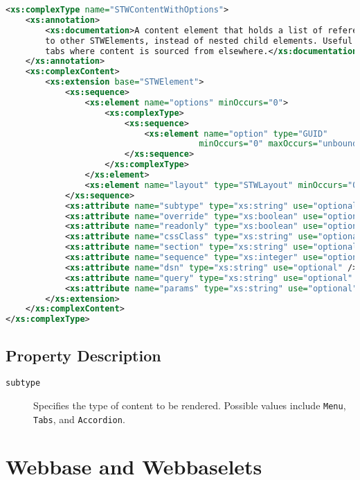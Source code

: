 \begin{lstlisting}[language=XML,caption={STWContentWithOptions XSD Definition}]
<xs:complexType name="STWContentWithOptions">
    <xs:annotation>
        <xs:documentation>A content element that holds a list of references (options) 
        to other STWElements, instead of nested child elements. Useful for menus and 
        tabs where content is sourced from elsewhere.</xs:documentation>
    </xs:annotation>
    <xs:complexContent>
        <xs:extension base="STWElement">
            <xs:sequence>
                <xs:element name="options" minOccurs="0">
                    <xs:complexType>
                        <xs:sequence>
                            <xs:element name="option" type="GUID" 
                                       minOccurs="0" maxOccurs="unbounded" />
                        </xs:sequence>
                    </xs:complexType>
                </xs:element>
                <xs:element name="layout" type="STWLayout" minOccurs="0" />
            </xs:sequence>
            <xs:attribute name="subtype" type="xs:string" use="optional" />
            <xs:attribute name="override" type="xs:boolean" use="optional" />
            <xs:attribute name="readonly" type="xs:boolean" use="optional" />
            <xs:attribute name="cssClass" type="xs:string" use="optional" />
            <xs:attribute name="section" type="xs:string" use="optional" />
            <xs:attribute name="sequence" type="xs:integer" use="optional" />
            <xs:attribute name="dsn" type="xs:string" use="optional" />
            <xs:attribute name="query" type="xs:string" use="optional" />
            <xs:attribute name="params" type="xs:string" use="optional" />
        </xs:extension>
    </xs:complexContent>
</xs:complexType>
\end{lstlisting}

\subsection{Property Description}

\begin{description}
\item[\texttt{subtype}] Specifies the type of content to be rendered. Possible values include \texttt{Menu}, \texttt{Tabs}, and \texttt{Accordion}.
\end{description}

\section{Webbase and Webbaselets}

